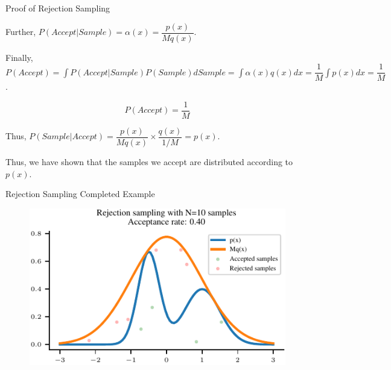 \documentclass[handout]{beamer}
\begin{document}
\begin{frame}{Proof of Rejection Sampling}
    


       
        

        Further, $P(Accept|Sample) = \alpha(x) = \dfrac{p(x)}{M q(x)}$.

        Finally, $P(Accept) = \int P(Accept|Sample) P(Sample) dSample = \int \alpha(x) q(x) dx = \dfrac{1}{M} \int p(x) dx = \dfrac{1}{M}$.
        \begin{tcolorbox}[colback=metropolisblue!5,colframe=metropolisblue,title={P(Accept)}]
            \begin{equation}
                P(Accept) = \frac{1}{M}
            \end{equation}
        \end{tcolorbox}
        

        Thus, $P(Sample|Accept) = \dfrac{p(x)}{M q(x)} \times \dfrac{q(x)}{1/M} = p(x)$.

        Thus, we have shown that the samples we accept are distributed according to $p(x)$.

        
    \end{frame}

    \begin{frame}{Rejection Sampling Completed Example}
        \begin{figure}
            \centering
            \includegraphics{notebooks/figures/sampling/rejection-sampling-N10-False.pdf}
        \end{figure}
        
    \end{frame}
\end{document}
